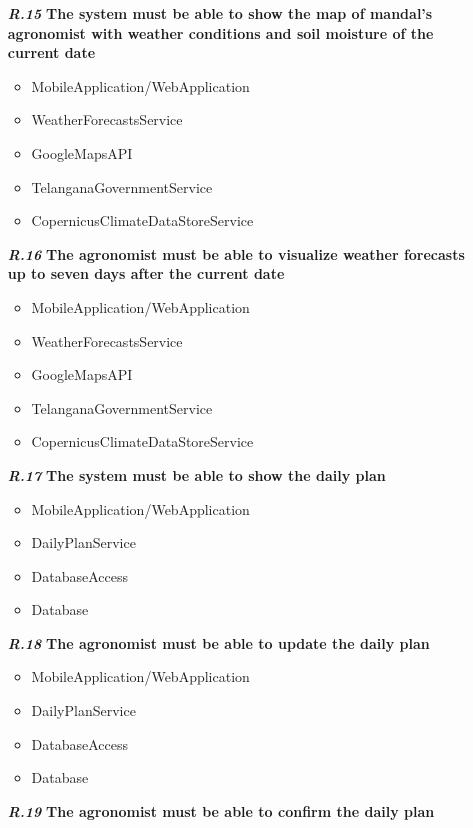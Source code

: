 \begin{itemize}
\item [\textbf{\textit{R.15}}] \textbf{The system must be able to show the map of mandal's agronomist with weather conditions and soil moisture of the current date}
   \begin{itemize}
     \item MobileApplication/WebApplication
     \item WeatherForecastsService
     \item GoogleMapsAPI
    \item TelanganaGovernmentService
    \item CopernicusClimateDataStoreService
\end{itemize} 
\item [\textbf{\textit{R.16}}] \textbf{The agronomist must be able to visualize weather forecasts up to seven days after the current date}
   \begin{itemize}
     \item MobileApplication/WebApplication
     \item WeatherForecastsService
     \item GoogleMapsAPI
    \item TelanganaGovernmentService
    \item CopernicusClimateDataStoreService
\end{itemize} 
\item [\textbf{\textit{R.17}}] \textbf{The system must be able to show the daily plan}
   \begin{itemize}
     \item MobileApplication/WebApplication
     \item DailyPlanService
     \item DatabaseAccess
     \item Database
\end{itemize}  
\item [\textbf{\textit{R.18}}] \textbf{The agronomist must be able to update the daily plan}
          \begin{itemize}
     \item MobileApplication/WebApplication
     \item DailyPlanService
     \item DatabaseAccess
     \item Database
\end{itemize}  
\item [\textbf{\textit{R.19}}] \textbf{The agronomist must be able to confirm the daily plan}
   \begin{itemize}

\end{itemize}
\end{itemize}

